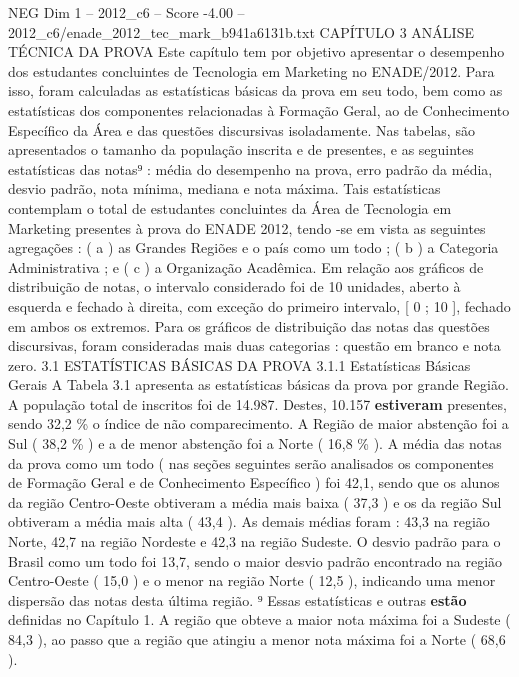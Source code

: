 \begin{textsample}{NEG Dim 1 – 2012\_c6 – Score -4.00 – 2012\_c6/enade\_2012\_tec\_mark\_b941a6131b.txt}  \label{ex:f1_neg_251}
CAPÍTULO 3 ANÁLISE TÉCNICA DA PROVA Este capítulo tem por objetivo apresentar o desempenho dos estudantes concluintes de Tecnologia em Marketing no ENADE/2012.
Para isso, foram calculadas as estatísticas básicas da prova em seu todo, bem como as estatísticas dos componentes relacionadas à Formação Geral, ao de Conhecimento Específico da Área e das questões discursivas isoladamente.
Nas tabelas, são apresentados o tamanho da população inscrita e de presentes, e as seguintes estatísticas das notas⁹ : média do desempenho na prova, erro padrão da média, desvio padrão, nota mínima, mediana e nota máxima.
Tais estatísticas contemplam o total de estudantes concluintes da Área de Tecnologia em Marketing presentes à prova do ENADE 2012, tendo -se em vista as seguintes agregações : ( a ) as Grandes Regiões e o país como um todo ; ( b ) a Categoria Administrativa ; e ( c ) a Organização Acadêmica.
Em relação aos gráficos de distribuição de notas, o intervalo considerado foi de 10 unidades, aberto à esquerda e fechado à direita, com exceção do primeiro intervalo, [ 0 ; 10 ], fechado em ambos os extremos.
Para os gráficos de distribuição das notas das questões discursivas, foram consideradas mais duas categorias : questão em branco e nota zero. 3.1 ESTATÍSTICAS BÁSICAS DA PROVA 3.1.1 Estatísticas Básicas Gerais A Tabela 3.1 apresenta as estatísticas básicas da prova por grande Região.
A população total de inscritos foi de 14.987.
Destes, 10.157 \textbf{estiveram} presentes, sendo 32,2 \% o índice de não comparecimento.
A Região de maior abstenção foi a Sul ( 38,2 \% ) e a de menor abstenção foi a Norte ( 16,8 \% ).
A média das notas da prova como um todo ( nas seções seguintes serão analisados os componentes de Formação Geral e de Conhecimento Específico ) foi 42,1, sendo que os alunos da região Centro-Oeste obtiveram a média mais baixa ( 37,3 ) e os da região Sul obtiveram a média mais alta ( 43,4 ).
As demais médias foram : 43,3 na região Norte, 42,7 na região Nordeste e 42,3 na região Sudeste.
O desvio padrão para o Brasil como um todo foi 13,7, sendo o maior desvio padrão encontrado na região Centro-Oeste ( 15,0 ) e o menor na região Norte ( 12,5 ), indicando uma menor dispersão das notas desta última região. ⁹ Essas estatísticas e outras \textbf{estão} definidas no Capítulo 1.
A região que obteve a maior nota máxima foi a Sudeste ( 84,3 ), ao passo que a região que atingiu a menor nota máxima foi a Norte ( 68,6 ).

\end{textsample}

